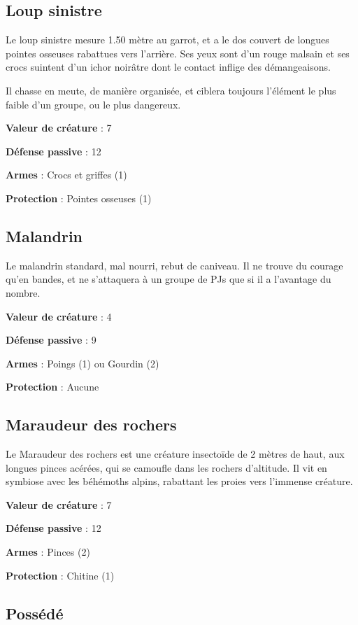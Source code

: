 \documentclass[10pt,twoside,twocolumn,openany,bg=print,justified]{dndbook}
\begin{document}
\subsection*{Loup sinistre}

Le loup sinistre mesure 1.50 mètre au garrot, et a le dos couvert de longues pointes osseuses rabattues vers l'arrière. Ses yeux sont d'un rouge malsain et ses crocs suintent d'un ichor noirâtre dont le contact inflige des démangeaisons.

Il chasse en meute, de manière organisée, et ciblera toujours l'élément le plus faible d'un groupe, ou le plus dangereux.

\textbf{Valeur de créature} : 7

\textbf{Défense passive} : 12

\textbf{Armes} : Crocs et griffes (1)

\textbf{Protection} : Pointes osseuses (1)

\subsection*{Malandrin}

Le malandrin standard, mal nourri, rebut de caniveau. Il ne trouve du courage qu'en bandes, et ne s'attaquera à un groupe de PJs que si il a l'avantage du nombre.

\textbf{Valeur de créature} : 4

\textbf{Défense passive} : 9

\textbf{Armes} : Poings (1) ou Gourdin (2)

\textbf{Protection} : Aucune

\subsection*{Maraudeur des rochers}

Le Maraudeur des rochers est une créature insectoïde de 2 mètres de haut, aux longues pinces acérées, qui se camoufle dans les rochers d'altitude. Il vit en symbiose avec les béhémoths alpins, rabattant les proies vers l'immense créature.

\textbf{Valeur de créature} : 7

\textbf{Défense passive} : 12

\textbf{Armes} : Pinces (2)

\textbf{Protection} : Chitine (1)

\subsection*{Possédé}
\end{document}

